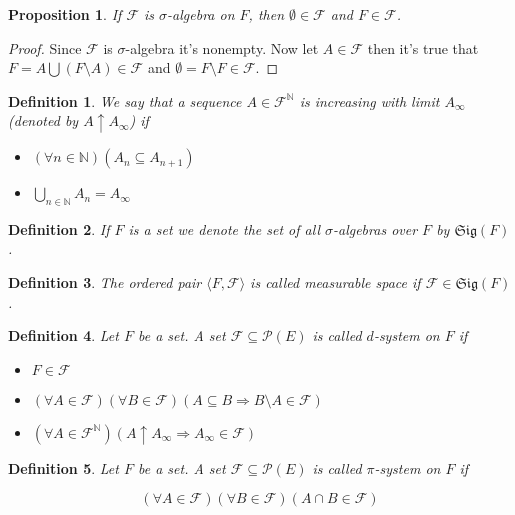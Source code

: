 \documentclass[a4paper]{amsart}
\newtheorem{deff}{Definition}
\newtheorem{prop}{Proposition}
\newcommand{\pow}[1]{\mathscr{P}\left(#1\right)}
\newcommand{\pair}[2]{\langle #1, #2\rangle}
\newcommand{\sig}[1]{\mathfrak{Sig}\left(#1\right)}
\newcommand{\NN}{\mathbb{N}}
\newcommand{\convg}{\uparrow}
\begin{document}
\begin{prop}
    If $\mathcal{F}$ is $\sigma$-algebra on $F$, then $\emptyset \in \mathcal{F}$ and
    $F \in \mathcal{F}$.
\end{prop}

\begin{proof}
    Since $\mathcal{F}$ is $\sigma$-algebra it's nonempty. 
    Now let $A \in \mathcal{F}$ then it's true that 
    $ F = A \bigcup \left(F \setminus A\right) \in \mathcal{F}$ 
    and $\emptyset = F \setminus F \in \mathcal{F}$. 
\end{proof}

\begin{deff}
    We say that a sequence $A \in \mathcal{F}^\NN$  is increasing with limit $A_\infty$ (denoted by $A \convg A_\infty$) if
    \begin{itemize}
        \item $\left( \forall n \in \NN\right) \left( A_n \subseteq A_{n+1} \right)$
        \item $\bigcup\limits_{n\in \NN} A_n = A_\infty$
    \end{itemize}
\end{deff}

\begin{deff}
    If $F$ is a set we denote the set of all $\sigma$-algebras over $F$ by $\sig{F}$.
\end{deff}
\begin{deff}
    The ordered pair $\pair{F}{\mathcal{F}}$ is called measurable space if $\mathcal{F} \in \sig{F}$.
\end{deff}

\begin{deff}
    Let $F$ be a set. A set $\mathcal{F} \subseteq \pow{E}$ is called $d$-system on $F$ if 
    \begin{itemize}
        \item $ F \in \mathcal{F}$
        \item $\left(\forall A \in \mathcal{F}\right) \left(\forall B \in \mathcal{F}\right)
        \left( A \subseteq B \Longrightarrow B \setminus A \in \mathcal{F} \right)$
        \item $\left(\forall A \in \mathcal{F}^\NN \right) \left( A \convg A_\infty \Longrightarrow A_\infty \in \mathcal{F} \right)$
    \end{itemize}
\end{deff}

\begin{deff}
    Let $F$ be a set. A set $\mathcal{F} \subseteq \pow{E}$ is 
    called $\pi$-system on $F$ if 
    
    $$ \left(\forall A \in \mathcal{F}\right) \left(\forall B \in 
    \mathcal{F}\right) \left( A \cap B \in \mathcal{F}\right) $$
\end{deff}
\end{document}
